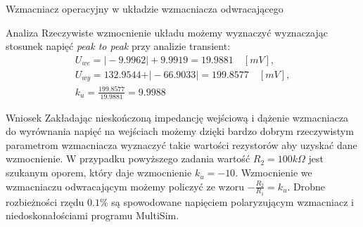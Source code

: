 \documentclass[a4paper]{scrartcl}
\begin{document}
\begin{section}{Wzmacniacz operacyjny w układzie wzmacniacza odwracającego}
\begin{subsection}{Analiza}
				Rzeczywiste wzmocnienie układu możemy wyznaczyć wyznaczając stosunek napięć \textit{peak to peak} przy analizie transient:%
				\begin{gather*}
					 U_{we} = \vert-9.9962\vert + 9.9919 = 19.9881\quad [mV], \\ 
					 U_{wy} = 132.9544 + \vert-66.9033\vert = 199.8577 \quad [mV],\\
					 k_{u} = \frac{199.8577}{19.9881} = 9.9988 
				\end{gather*}
		\end{subsection}
		\begin{subsection}{Wniosek}
			Zakładając nieskończoną impedancję wejściową i dążenie wzmacniacza do wyrównania napięć na wejściach możemy dzięki bardzo dobrym rzeczywistym parametrom wzmacniacza wyznaczyć takie wartości rezystorów aby uzyskać dane wzmocnienie. W przypadku powyższego zadania wartość $ R_{2} = 100k\Omega $ jest szukanym oporem, który daje wzmocnienie $ k_{u} = -10 $. Wzmocnienie we wzmacniaczu odwracającym możemy policzyć ze wzoru $-\frac{R_{2}}{R_{1}} = k_{u} $. Drobne rozbieżności rzędu $0.1 \% $ są spowodowane napięciem polaryzującym wzmacniacz i niedoskonałościami programu MultiSim.
		\end{subsection}
	\end{section}
\end{document}
